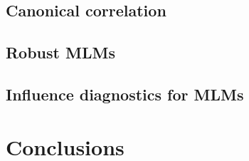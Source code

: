 \documentclass[10pt,t]{beamer}
\begin{document}
\subsection{Canonical correlation}



\subsection{Robust MLMs}

\subsection[Influence diagnostics]{Influence diagnostics for MLMs}


\section{Conclusions}


%
\end{document}
